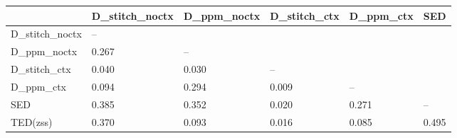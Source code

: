\begin{tabular}{llllll}
\toprule
 & D_stitch_noctx & D_ppm_noctx & D_stitch_ctx & D_ppm_ctx & SED \\
\midrule
D_stitch_noctx & -- &  &  &  &  \\
D_ppm_noctx & 0.267 & -- &  &  &  \\
D_stitch_ctx & 0.040 & 0.030 & -- &  &  \\
D_ppm_ctx & 0.094 & 0.294 & 0.009 & -- &  \\
SED & 0.385 & 0.352 & 0.020 & 0.271 & -- \\
TED(zss) & 0.370 & 0.093 & 0.016 & 0.085 & 0.495 \\
\bottomrule
\end{tabular}
